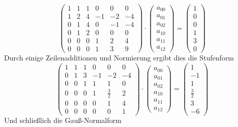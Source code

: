 $$
\begin{pmatrix}1& 1 & 1 & 0 &0&0 \\1&2&4 &-1&-2&-4\\ 0&1&4 &0&-1&-4 \\ 0&1&2 & 0&0&0 \\ 0&0&0&1&2&4 \\ 0&0&0&1&3&9 \end{pmatrix}
\cdot \begin{pmatrix} a_{00}\\a_{01}\\ a_{02}\\ a_{10}\\ a_{11}\\ a_{12}   \end{pmatrix}
=\begin{pmatrix} 1\\0\\0\\1 \\3\\0 \end{pmatrix}
$$
Durch einige Zeilenadditionen und Normierung ergibt dies die Stufenform
$$
\begin{pmatrix}1& 1 & 1 & 0 &0&0 \\0&1&3 &-1&-2&-4\\ 0&0&1 &1&1&0 \\ 0&0&0 &1&\frac{3}{2}&2 \\0&0&0&0&1&4 \\ 0&0&0&0&0&1 \end{pmatrix}
\cdot \begin{pmatrix} a_{00}\\a_{01}\\ a_{02}\\ a_{10}\\ a_{11}\\ a_{12}   \end{pmatrix}
=\begin{pmatrix} 1\\-1\\1\\\frac{3}{2} \\3\\-6 \end{pmatrix}
$$
Und schließlich die Gauß-Normalform
